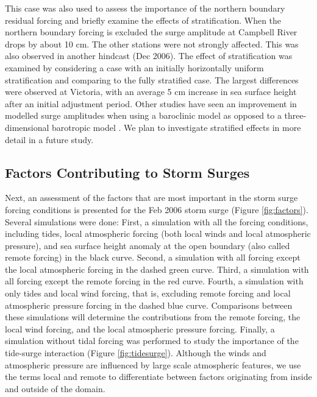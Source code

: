 \documentclass[letterpaper]{tATO2e}
\begin{document}
{\color{red} This case was also used to assess the importance of the northern boundary residual forcing and briefly examine the effects of stratification. When the northern boundary forcing is excluded the surge amplitude at Campbell River drops by about 10 cm. The other stations were not strongly affected. This was also observed in another hindcast (Dec 2006). The effect of stratification was examined by considering a case with an initially horizontally uniform stratification and comparing to the fully stratified case. The largest differences were observed at Victoria, with an average 5 cm increase in sea surface height after an initial adjustment period. Other studies have seen an improvement in modelled surge amplitudes when using a baroclinic model as opposed to a three-dimensional barotropic model \citep{ma2015oceanic}. We plan to investigate stratified effects in more detail in a future study.} 

\subsection{Factors Contributing to Storm Surges}\label{sec:factors}

Next, an assessment of the factors that are most important in the storm surge forcing conditions is presented for the Feb 2006 storm surge (Figure \ref{fig:factors}). Several simulations were done: First, a simulation with all the forcing conditions, including tides, local atmospheric forcing (both local winds and local atmospheric pressure), and sea surface height anomaly at the open boundary (also called remote forcing) in the black curve. Second, a simulation with all forcing except the local atmospheric forcing in the dashed green curve. Third, a simulation with all forcing except the remote forcing in the red curve. Fourth, a simulation with only tides and local wind forcing, that is, excluding remote forcing and local atmospheric pressure forcing in the dashed blue curve. {\color{red} Comparisons between these simulations will determine the contributions from the remote forcing, the local wind forcing, and the local atmospheric pressure forcing.} Finally, a simulation without tidal forcing was performed to study the importance of the tide-surge interaction (Figure \ref{fig:tidesurge}).  {\color{red} Although the winds and atmospheric pressure are influenced by large scale atmospheric features, we use the terms local and remote to differentiate between factors originating from inside and outside of the domain.} 
\end{document}
